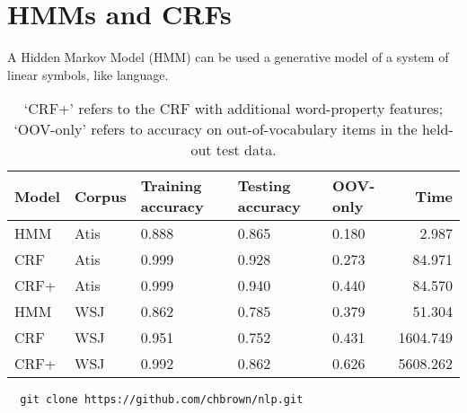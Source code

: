 \documentclass[10pt]{article}\usepackage{graphicx, color}
\begin{document}
\section{HMMs and CRFs}

A Hidden Markov Model (HMM) can be used a generative model of a system of linear symbols, like language.







\begin{table}[H]
  \begin{tabular}{lllllr}
    Model & Corpus & Training accuracy & Testing accuracy & OOV-only & Time \\
    \midrule
    HMM   & Atis & 0.888 & 0.865 &
      0.180 & 2.987 \\
    CRF   & Atis & 0.999 & 0.928 &
      0.273 & 84.971 \\
    CRF+ & Atis & 0.999 & 0.940 &
      0.440 & 84.570 \\
    \midrule
    HMM   & WSJ & 0.862 & 0.785 &
      0.379 & 51.304 \\
    CRF   & WSJ & 0.951 & 0.752 &
      0.431 & 1604.749 \\
    CRF+ & WSJ & 0.992 & 0.862 &
      0.626 & 5608.262 \\
  \end{tabular}
  \caption{`CRF+' refers to the CRF with additional word-property features; `OOV-only' refers to accuracy on out-of-vocabulary items in the held-out test data.}
\end{table}




\begin{lstlisting}
  git clone https://github.com/chbrown/nlp.git
\end{lstlisting}
\end{document}
